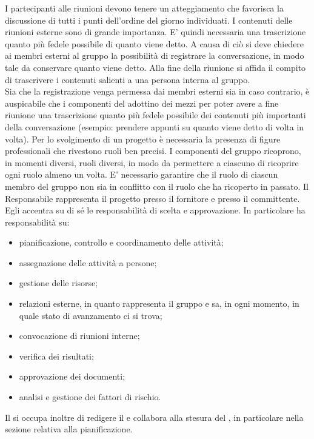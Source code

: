 					I partecipanti alle riunioni devono tenere un atteggiamento che favorisca la discussione di tutti i punti dell'ordine del giorno individuati.
					I contenuti delle riunioni esterne sono di grande importanza. E' quindi necessaria una trascrizione quanto più fedele possibile di quanto viene detto. A causa di ciò si deve chiedere ai membri esterni al gruppo la possibilità di registrare la conversazione, in modo tale da conservare quanto viene detto. Alla fine della riunione si affida il compito di trascrivere i contenuti salienti a una persona interna al gruppo.\\
					Sia che la registrazione venga permessa dai membri esterni sia in caso contrario, è auspicabile che i componenti del  adottino dei mezzi per poter avere a fine riunione una trascrizione quanto più fedele possibile dei contenuti più importanti della conversazione (esempio: prendere appunti su quanto viene detto di volta in volta).
			Per lo svolgimento di un progetto è necessaria la presenza di figure professionali che rivestono ruoli ben precisi. I componenti del gruppo ricoprono, in momenti diversi, ruoli diversi, in modo da permettere a ciascuno di ricoprire ogni ruolo almeno un volta. E' necessario garantire che il ruolo di ciascun membro del gruppo non sia in conflitto con il ruolo che ha ricoperto in passato.
				Il Responsabile rappresenta il progetto presso il fornitore e presso il committente. Egli accentra su di sé le responsabilità di scelta e approvazione. In particolare ha responsabilità su:
				\begin{itemize}
					\item pianificazione, controllo e coordinamento delle attività;
					\item assegnazione delle attività a persone;
					\item gestione delle risorse;
					\item relazioni esterne, in quanto rappresenta il gruppo e sa, in ogni momento, in quale stato di avanzamento ci si trova;
					\item convocazione di riunioni interne;
					\item verifica dei risultati;
					\item approvazione dei documenti;
					\item analisi e gestione dei fattori di rischio.
				\end{itemize}
				Il  si occupa inoltre di redigere il  e collabora alla stesura del , in particolare nella sezione relativa alla pianificazione.
